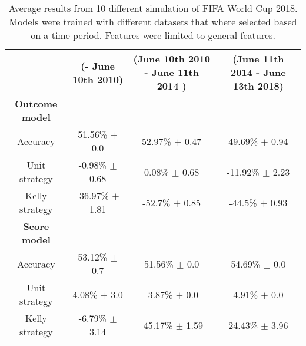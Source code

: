 \begin{sidewaystable}
    \caption{Average results from 10 different simulation of FIFA World Cup 2018. Models were trained with different datasets that where selected based on a time period. Features were limited to general features.}
    \begin{tabular}{ | c |c| c | c |}
    \hline
    & (- June 10th 2010) & (June 10th 2010 - June 11th 2014 ) & (June 11th 2014 - June 13th 2018) \\
    \hline
    \textbf{Outcome model} \\
    \hline
    Accuracy & 51.56\% $\pm$ 0.0 & 52.97\% $\pm$ 0.47 & 49.69\% $\pm$ 0.94 \\
    Unit strategy & -0.98\% $\pm$ 0.68 & 0.08\% $\pm$ 0.68 & -11.92\% $\pm$ 2.23 \\
    Kelly strategy & -36.97\% $\pm$ 1.81 & -52.7\% $\pm$ 0.85 & -44.5\% $\pm$ 0.93 \\
    \hline
    \textbf{Score model} \\
    \hline
    Accuracy & 53.12\% $\pm$ 0.7 & 51.56\% $\pm$ 0.0 & 54.69\% $\pm$ 0.0 \\
    Unit strategy & 4.08\% $\pm$ 3.0 & -3.87\% $\pm$ 0.0 & 4.91\% $\pm$ 0.0 \\
    Kelly strategy & -6.79\% $\pm$ 3.14 & -45.17\% $\pm$ 1.59 & 24.43\% $\pm$ 3.96 \\
    \hline
   \end{tabular}
\end{sidewaystable}